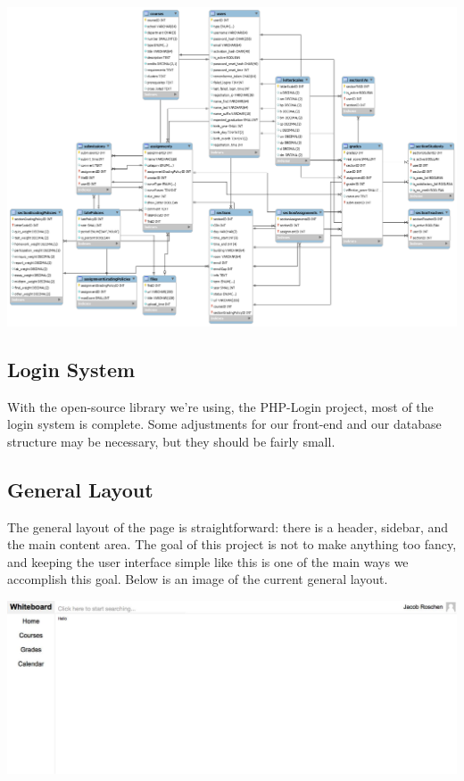 \documentclass{article}
\begin{document}
\includegraphics[width=6.5 in]{db}

\subsection{Login System}

With the open-source library we're using, the PHP-Login project, most of the
login system is complete. Some adjustments for our front-end and our database
structure may be necessary, but they should be fairly small.

\subsection{General Layout}

The general layout of the page is straightforward: there is a header, sidebar,
and the main content area. The goal of this project is not to make anything too
fancy, and keeping the user interface simple like this is one of the main ways
we accomplish this goal. Below is an image of the current general layout.

\includegraphics[width=6.5 in]{general_layout}
\end{document}
